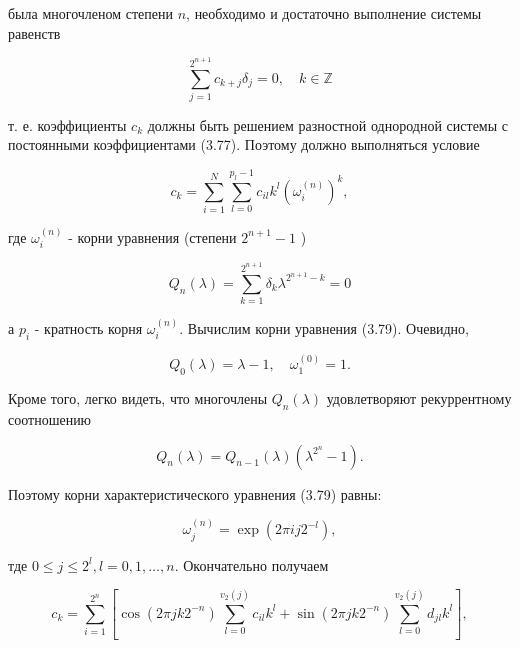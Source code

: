 \documentclass[10pt]{article}
\begin{document}
была многочленом степени $n$, необходимо и достаточно выполнение системы равенств


\begin{equation*}
\sum_{j=1}^{2^{n+1}} c_{k+j} \delta_{j}=0, \quad k \in \mathbb{Z} \tag{3.77}
\end{equation*}


т. е. коэффициенты $c_{k}$ должны быть решением разностной однородной системы с постоянными коэффициентами (3.77). Поэтому должно выполняться условие


\begin{equation*}
c_{k}=\sum_{i=1}^{N} \sum_{l=0}^{p_{l}-1} c_{i l} k^{l}\left(\omega_{i}^{(n)}\right)^{k}, \tag{3.78}
\end{equation*}


где $\omega_{i}^{(n)}$ - корни уравнения (степени $2^{n+1}-1$ )


\begin{equation*}
Q_{n}(\lambda)=\sum_{k=1}^{2^{n+1}} \delta_{k} \lambda^{2^{n+1}-k}=0 \tag{3.79}
\end{equation*}


а $p_{i}$ - кратность корня $\omega_{i}^{(n)}$. Вычислим корни уравнения (3.79). Очевидно,


\begin{equation*}
Q_{0}(\lambda)=\lambda-1, \quad \omega_{1}^{(0)}=1 . \tag{3.80}
\end{equation*}


Кроме того, легко видеть, что многочлены $Q_{n}(\lambda)$ удовлетворяют рекуррентному соотношению


\begin{equation*}
Q_{n}(\lambda)=Q_{n-1}(\lambda)\left(\lambda^{2^{n}}-1\right) . \tag{3.81}
\end{equation*}


Поэтому корни характеристического уравнения (3.79) равны:


\begin{equation*}
\omega_{j}^{(n)}=\exp \left(2 \pi i j 2^{-l}\right), \tag{3.82}
\end{equation*}


тде $0 \leqslant j \leqslant 2^{l}, l=0,1, \ldots, n$. Окончательно получаем


\begin{equation*}
c_{k}=\sum_{i=1}^{2^{n}}\left[\cos \left(2 \pi j k 2^{-n}\right) \sum_{l=0}^{v_{2}(j)} c_{i l} k^{l}+\sin \left(2 \pi j k 2^{-n}\right) \sum_{l=0}^{v_{2}(j)} d_{j l} k^{l}\right], \tag{3.83}
\end{equation*}
\end{document}
